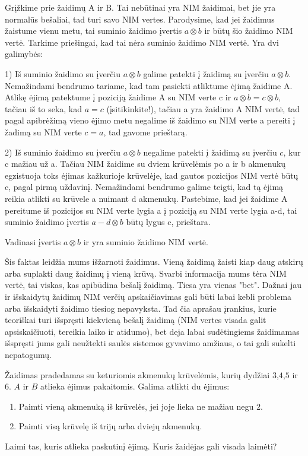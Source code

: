 Grįžkime prie žaidimų A ir B. Tai nebūtinai yra NIM žaidimai, bet jie yra normalūs bešaliai, tad turi savo NIM vertes. Parodysime, kad jei žaidimus žaistume vienu metu, tai suminio žaidimo įvertis  $a\otimes b$ ir būtų šio žaidimo NIM vertė. Tarkime priešingai, kad tai nėra suminio žaidimo NIM vertė. Yra dvi galimybės:

1) Iš suminio žaidimo su įverčiu $a\otimes b$ galime patekti į žaidimą su įverčiu $a\otimes b$. Nemažindami bendrumo tariame, kad tam pasiekti atliktume ėjimą žaidime A. Atlikę ėjimą patektume į poziciją žaidime A su NIM verte c ir $a\otimes b = c\otimes b$, tačiau iš to seka, kad $a=c$ (įsitikinkite!), tačiau a yra žaidimo A NIM vertė, tad pagal apibrėžimą vieno ėjimo metu negalime iš žaidimo su NIM verte a pereiti į žadimą su NIM verte $c=a$, tad gavome prieštarą. 

2) Iš suminio žaidimo su įverčiu $a\otimes b$ negalime patekti į žaidimą su įverčiu $c$, kur c mažiau už a. Tačiau NIM žaidime su dviem krūvelėmis po a ir b akmenukų egzistuoja toks ėjimas kažkurioje krūvelėje, kad gautos pozicijos NIM vertė būtų c, pagal pirmą uždavinį. Nemažindami bendrumo galime teigti, kad tą ėjimą reikia atlikti su krūvele a nuimant d akmenukų. Pastebime, kad jei žaidime A pereitume iš pozicijos su NIM verte lygia a į poziciją su NIM verte lygia a-d, tai suminio žaidimo įvertis  $a-d\otimes b$ būtų lygus c, prieštara. 

Vadinasi įvertis $a\otimes b$ ir yra suminio žaidimo NIM vertė. 

Šis faktas leidžia mums išžarnoti žaidimus. Vieną žaidimą žaisti kiap daug atskirų arba suplakti daug žaidimų į vieną krūvą. Svarbi informacija mums tėra NIM vertė, tai viskas, kas apibūdina bešalį žaidimą. Tiesa yra vienas "bet". Dažnai jau ir išskaidytų žaidimų NIM verčių apskaičiavimas gali būti labai kebli problema arba išskaidyti žaidimo tiesiog nepavyksta. Tad čia aprašau įrankius, kurie teoriškai turi išspręsti kiekvieną bešalį žaidimą (NIM vertes visada galit apsiskaičiuoti, tereikia laiko ir atidumo), bet deja labai sudėtingiems žaidimamas išspręsti jums gali neužtekti saulės sistemos gyvavimo amžiaus, o tai gali sukelti nepatogumų.  

\begin{pavnr}   Žaidimas pradedamas su keturiomis akmenukų krūvelėmis, kurių dydžiai
  $3$,$4$,$5$ ir $6$. $A$ ir $B$ atlieka ėjimus pakaitomis. Galima atlikti
  du ėjimus:
  \begin{enumerate}
    \item Paimti vieną akmenuką iš krūvelės, jei joje lieka ne mažiau negu $2$.
    \item Paimti visą krūvelę iš trijų arba dviejų akmenukų.
  \end{enumerate}
 Laimi tas, kuris atlieka paskutinį ėjimą. Kuris žaidėjas gali visada laimėti?
\end{pavnr}

